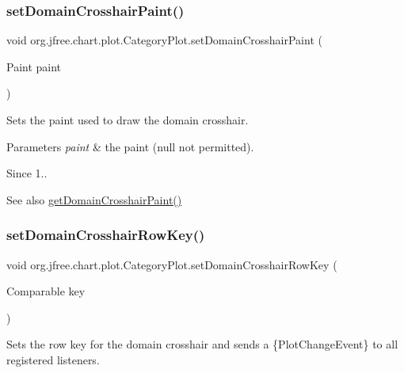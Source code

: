 \subsubsection{\texorpdfstring{set\+Domain\+Crosshair\+Paint()}{setDomainCrosshairPaint()}}
{\footnotesize\ttfamily void org.\+jfree.\+chart.\+plot.\+Category\+Plot.\+set\+Domain\+Crosshair\+Paint (\begin{DoxyParamCaption}\item[{Paint}]{paint }\end{DoxyParamCaption})}

Sets the paint used to draw the domain crosshair.


\begin{DoxyParams}{Parameters}
{\em paint} & the paint ({\ttfamily null} not permitted).\\
\hline
\end{DoxyParams}
\begin{DoxySince}{Since}
1..
\end{DoxySince}
\begin{DoxySeeAlso}{See also}
\mbox{\hyperlink{classorg_1_1jfree_1_1chart_1_1plot_1_1_category_plot_af251f4c3084a499f54915e07d09ba19c}{get\+Domain\+Crosshair\+Paint()}} 
\end{DoxySeeAlso}
\mbox{\label{classorg_1_1jfree_1_1chart_1_1plot_1_1_category_plot_a0c603c55e35ebdbf75f4172dbe200d36}} 
\subsubsection{\texorpdfstring{set\+Domain\+Crosshair\+Row\+Key()}{setDomainCrosshairRowKey()}\hspace{0.1cm}{\footnotesize\ttfamily [1/2]}}
{\footnotesize\ttfamily void org.\+jfree.\+chart.\+plot.\+Category\+Plot.\+set\+Domain\+Crosshair\+Row\+Key (\begin{DoxyParamCaption}\item[{Comparable}]{key }\end{DoxyParamCaption})}

Sets the row key for the domain crosshair and sends a \{Plot\+Change\+Event\} to all registered listeners.


